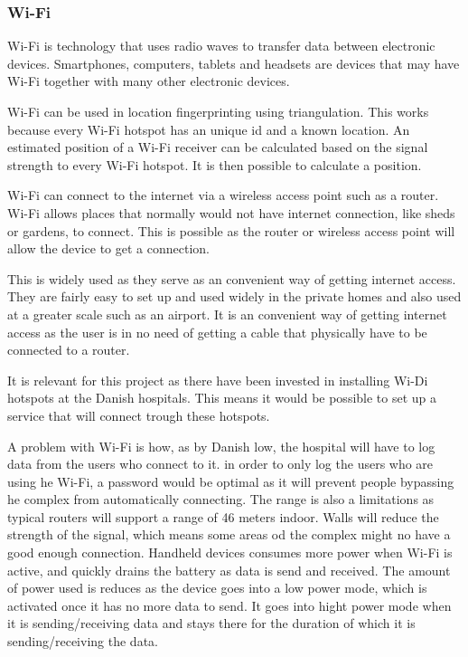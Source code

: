 \subsubsection{Wi-Fi} \label{wifitech}
Wi-Fi is  technology that uses radio waves to transfer data between electronic devices. Smartphones, computers, tablets and headsets are devices that may have Wi-Fi together with many other electronic devices\cite{wifi_devices}.

Wi-Fi can be used in location fingerprinting using triangulation. This works because every Wi-Fi hotspot has an unique id and a known location. An estimated position of a Wi-Fi receiver can be calculated based on the signal strength to every Wi-Fi hotspot. It is then possible to calculate a position.\cite{Liu2007}

Wi-Fi can connect to the internet via a wireless access point such as a router. Wi-Fi allows places that normally would not have internet connection, like sheds or gardens, to connect. This is possible as the router or wireless access point will allow the device to get a connection.

This is widely used as they serve as an convenient way of getting internet access. They are fairly easy to set up and used widely in the private homes and also used at a greater scale such as an airport\cite{wifi_works}. It is an convenient way of getting internet access as the user is in no need of getting a cable that physically have to be connected to a router.

It is relevant for this project as there have been invested in installing Wi-Di hotspots at the Danish hospitals\cite{wifi_hospi}. This means it would be possible to set up a service that will connect trough these hotspots.

A problem with Wi-Fi is how, as by Danish low, the hospital will have to log data from the users who connect to it\cite{wifi_log}. in order to only log the users who are using he Wi-Fi, a password would be optimal as it will prevent people bypassing he complex from automatically connecting. The range is also a limitations as typical routers will support a range of 46 meters indoor\cite{wifi_range}. Walls will reduce the strength of the signal, which means some areas od the complex might no have a good enough connection\cite{wifi_wall}. Handheld devices consumes more power when Wi-Fi is active, and quickly drains the battery as data is send and received\cite{wifi_batt}. The amount of power used is reduces as the device goes into a low power mode, which is activated once it has no more data to send. It goes into hight power mode when it is sending/receiving data and stays there for the duration of which it is sending/receiving the data.

